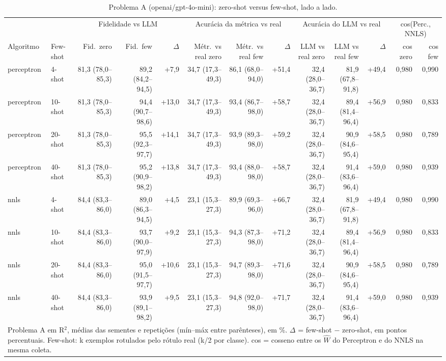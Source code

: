\begin{table}[htbp]
\centering
\footnotesize
\caption{Problema A (openai/gpt-4o-mini): zero-shot versus few-shot, lado a lado.}
\label{tab:T6_zero_few_A_gpt4mini}
\begin{tabular}{llrrrrrrrrrrr}
\toprule
 &  & \multicolumn{3}{c}{Fidelidade vs LLM} & \multicolumn{3}{c}{Acurácia da métrica vs real} & \multicolumn{3}{c}{Acurácia do LLM vs real} & \multicolumn{2}{c}{cos(Perc., NNLS)} \\ \cmidrule(lr){3-5} \cmidrule(lr){6-8} \cmidrule(lr){9-11} \cmidrule(lr){12-13}
Algoritmo & Few-shot & Fid.\ zero & Fid.\ few & $\Delta$ & Métr.\ vs real zero & Métr.\ vs real few & $\Delta$ & LLM vs real zero & LLM vs real few & $\Delta$ & cos zero & cos few \\
\midrule
perceptron & 4-shot & 81,3 (78,0–85,3) & 89,2 (84,2–94,5) & +7,9 & 34,7 (17,3–49,3) & 86,1 (68,0–94,0) & +51,4 & 32,4 (28,0–36,7) & 81,9 (67,8–91,8) & +49,4 & 0,980 & 0,990 \\
perceptron & 10-shot & 81,3 (78,0–85,3) & 94,4 (90,7–98,6) & +13,0 & 34,7 (17,3–49,3) & 93,4 (86,7–98,0) & +58,7 & 32,4 (28,0–36,7) & 89,4 (81,4–96,4) & +56,9 & 0,980 & 0,833 \\
perceptron & 20-shot & 81,3 (78,0–85,3) & 95,5 (92,3–97,7) & +14,1 & 34,7 (17,3–49,3) & 93,9 (89,3–98,0) & +59,2 & 32,4 (28,0–36,7) & 90,9 (84,6–95,4) & +58,5 & 0,980 & 0,789 \\
perceptron & 40-shot & 81,3 (78,0–85,3) & 95,2 (90,9–98,2) & +13,8 & 34,7 (17,3–49,3) & 93,4 (88,0–98,0) & +58,7 & 32,4 (28,0–36,7) & 91,4 (83,6–96,4) & +59,0 & 0,980 & 0,939 \\
\midrule
nnls & 4-shot & 84,4 (83,3–86,0) & 89,0 (86,3–94,5) & +4,5 & 23,1 (15,3–27,3) & 89,9 (69,3–96,0) & +66,7 & 32,4 (28,0–36,7) & 81,9 (67,8–91,8) & +49,4 & 0,980 & 0,990 \\
nnls & 10-shot & 84,4 (83,3–86,0) & 93,7 (90,0–97,9) & +9,2 & 23,1 (15,3–27,3) & 94,3 (87,3–98,0) & +71,2 & 32,4 (28,0–36,7) & 89,4 (81,4–96,4) & +56,9 & 0,980 & 0,833 \\
nnls & 20-shot & 84,4 (83,3–86,0) & 95,0 (91,5–97,7) & +10,6 & 23,1 (15,3–27,3) & 94,7 (89,3–98,0) & +71,6 & 32,4 (28,0–36,7) & 90,9 (84,6–95,4) & +58,5 & 0,980 & 0,789 \\
nnls & 40-shot & 84,4 (83,3–86,0) & 93,9 (89,1–98,2) & +9,5 & 23,1 (15,3–27,3) & 94,8 (92,0–98,0) & +71,7 & 32,4 (28,0–36,7) & 91,4 (83,6–96,4) & +59,0 & 0,980 & 0,939 \\
\bottomrule
\multicolumn{13}{p{0.95\linewidth}}{\footnotesize Problema A em R$^2$, médias das sementes e repetições (mín–máx entre parênteses), em \%. $\Delta$ = few-shot $-$ zero-shot, em pontos percentuais. Few-shot: k exemplos rotulados pelo rótulo real (k/2 por classe). cos = cosseno entre os $\hat{W}$ do Perceptron e do NNLS na mesma coleta.} \\
\end{tabular}
\end{table}
